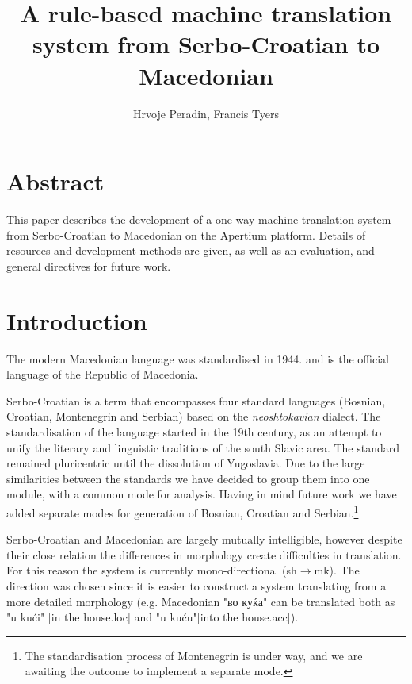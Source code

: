 \documentclass{book}
\title{A rule-based machine translation system from Serbo-Croatian to Macedonian}
\author{Hrvoje Peradin, Francis Tyers}
\begin{document}
\frontmatter      %

\maketitle

\setcounter{page}{5}
\setcounter{tocdepth}{0}  %


\section*{Abstract}
This paper describes the development of a one-way machine translation system
from Serbo-Croatian to Macedonian on the Apertium
platform.
Details of resources and development methods are given, as well as an
evaluation, and general directives for future work.

\section{Introduction}
The modern Macedonian language was standardised in 1944. and
is the official language of the Republic of Macedonia.

Serbo-Croatian is a term that encompasses four standard languages 
(Bosnian, Croatian, Montenegrin and Serbian) based on the 
\emph{neoshtokavian} dialect. The standardisation of the language started
in the 19th century, as an attempt to unify the literary and linguistic 
traditions of the south Slavic area. The standard remained pluricentric
until the dissolution of Yugoslavia. Due to the large similarities between 
the standards we have decided to group them into one module, with a common
mode for analysis. Having in mind future work we have added separate modes 
for generation of Bosnian, Croatian and Serbian.\footnote{The standardisation
process of Montenegrin is under way, and we are awaiting the outcome to implement a separate
mode.}

Serbo-Croatian and Macedonian are largely mutually intelligible, however despite their close relation the differences in morphology 
create difficulties in translation. For this reason the system is currently mono-directional (sh$\rightarrow$mk). 
The direction was chosen since it is easier to construct a system translating from a more detailed morphology 
(e.g. Macedonian "во куќа" can be translated both as "u kući" [in the house{\sc .loc}] and "u kuću"[into the house{\sc .acc}]).
\end{document}
